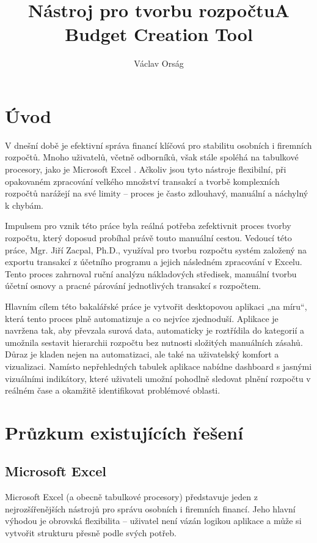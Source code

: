 \documentclass[
program=itk,
biblatex,
language=czech,
font=sans,
figures=true,
tables=false,
sourcecodes=false,
glossaries,
index
]{kidiplom}
\title{Nástroj pro tvorbu rozpočtu}
\title[english]{A Budget Creation Tool}
\author{Václav Orság}
\begin{document}
\maketitle


\section{Úvod}
V dnešní době je efektivní správa financí klíčová pro stabilitu osobních i firemních rozpočtů. Mnoho uživatelů, včetně odborníků, však stále spoléhá na tabulkové procesory, jako je Microsoft Excel \cite{excel}. Ačkoliv jsou tyto nástroje flexibilní, při opakovaném zpracování velkého množství transakcí a tvorbě komplexních rozpočtů narážejí na své limity – proces je často zdlouhavý, manuální a náchylný k chybám.

Impulsem pro vznik této práce byla reálná potřeba zefektivnit proces tvorby rozpočtu, který doposud probíhal právě touto manuální cestou. Vedoucí této práce, Mgr. Jiří Zacpal, Ph.D., využíval pro tvorbu rozpočtu systém založený na exportu transakcí z účetního programu a jejich následném zpracování v Excelu. Tento proces zahrnoval ruční analýzu nákladových středisek, manuální tvorbu účetní osnovy a pracné párování jednotlivých transakcí s rozpočtem.

Hlavním cílem této bakalářské práce je vytvořit desktopovou aplikaci „na míru“, která tento proces plně automatizuje a co nejvíce zjednoduší. Aplikace je navržena tak, aby převzala surová data, automaticky je roztřídila do kategorií a umožnila sestavit hierarchii rozpočtu bez nutnosti složitých manuálních zásahů. Důraz je kladen nejen na automatizaci, ale také na uživatelský komfort a vizualizaci. Namísto nepřehledných tabulek aplikace nabídne dashboard s jasnými vizuálními indikátory, které uživateli umožní pohodlně sledovat plnění rozpočtu v reálném čase a okamžitě identifikovat problémové oblasti.

\section{Průzkum existujících řešení}

\subsection{Microsoft Excel}
Microsoft Excel (a obecně tabulkové procesory) představuje jeden z nejrozšířenějších nástrojů pro správu osobních i firemních financí. Jeho hlavní výhodou je obrovská flexibilita – uživatel není vázán logikou aplikace a může si vytvořit strukturu přesně podle svých potřeb.
\end{document}
